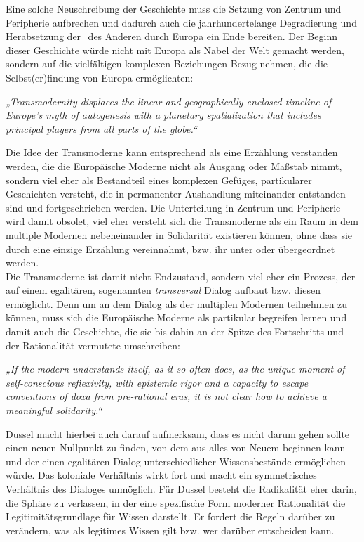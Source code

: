 \noindent Eine solche Neuschreibung der Geschichte muss die Setzung von Zentrum und
Peripherie aufbrechen und dadurch auch die jahrhundertelange Degradierung und
Herabsetzung der\_des Anderen durch Europa ein Ende bereiten. Der Beginn dieser
Geschichte würde nicht mit Europa als Nabel der Welt gemacht werden, sondern auf
die vielfältigen komplexen Beziehungen Bezug nehmen, die die Selbst(er)findung
von Europa ermöglichten:
\begin{myenv}
    \textit{„Transmodernity displaces the linear and geographically enclosed timeline of
    Europe’s myth of autogenesis with a planetary spatialization that includes
    principal players from all parts of the globe.“\footnotemark}
\end{myenv}
Die Idee der Transmoderne kann entsprechend als eine Erzählung verstanden
werden, die die Europäische Moderne nicht als Ausgang oder Maßstab nimmt,
sondern viel eher als Bestandteil eines komplexen Gefüges, partikularer
Geschichten versteht, die in permanenter Aushandlung miteinander entstanden sind
und fortgeschrieben werden. Die Unterteilung in Zentrum und Peripherie wird
damit obsolet, viel eher versteht sich die Transmoderne als ein Raum in dem
multiple Modernen nebeneinander in Solidarität existieren können, ohne dass sie
durch eine einzige Erzählung vereinnahmt, bzw. ihr unter oder übergeordnet werden. \\

\noindent Die Transmoderne ist damit nicht Endzustand, sondern viel eher ein Prozess, der
auf einem egalitären, sogenannten \textit{transversal} Dialog aufbaut bzw. diesen
ermöglicht. Denn um an dem Dialog als der multiplen Modernen teilnehmen zu
können, muss sich die Europäische Moderne als partikular begreifen lernen und
damit auch die Geschichte, die sie bis dahin an der Spitze des Fortschritts und
der Rationalität vermutete umschreiben:
\begin{myenv} 
    \textit{„If the modern understands itself, as it so often does, as the
    unique moment of self-conscious reflexivity, with epistemic rigor and a
    capacity to escape conventions of doxa from pre-rational eras, it is not
clear how to achieve a meaningful solidarity.“\footnotemark {}}
\end{myenv}
Dussel macht hierbei auch darauf aufmerksam, dass es nicht darum gehen sollte
einen neuen Nullpunkt zu finden, von dem aus alles von Neuem beginnen kann und
der einen egalitären Dialog unterschiedlicher Wissensbestände ermöglichen würde.
Das koloniale Verhältnis wirkt fort und macht ein symmetrisches Verhältnis des
Dialoges unmöglich. Für Dussel besteht die Radikalität eher darin, die Sphäre zu
verlassen, in der eine spezifische Form moderner Rationalität die
Legitimitätsgrundlage für Wissen darstellt. Er fordert die Regeln darüber zu
verändern, was als legitimes Wissen gilt bzw. wer darüber entscheiden kann.\\

